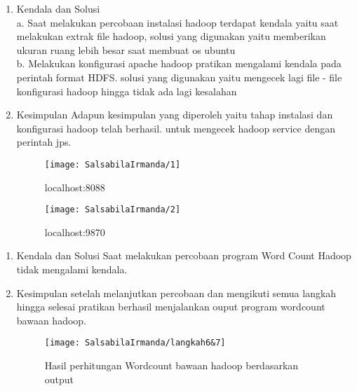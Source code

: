 
\begin{enumerate}
\item Kendala dan Solusi\\
a. Saat melakukan percobaan instalasi hadoop terdapat kendala yaitu saat melakukan extrak file hadoop, solusi yang digunakan yaitu memberikan ukuran ruang lebih besar saat membuat os ubuntu\\
b. Melakukan konfigurasi apache hadoop pratikan mengalami kendala pada perintah format HDFS. solusi yang digunakan yaitu mengecek lagi file - file konfigurasi hadoop hingga tidak ada lagi kesalahan

\item Kesimpulan
Adapun kesimpulan yang diperoleh yaitu tahap instalasi dan konfigurasi hadoop telah berhasil. untuk mengecek hadoop service dengan perintah jps.
\begin{figure}[!ht]
\texttt{[image: SalsabilaIrmanda/1]}
\caption{localhost:8088}
\label{gam:perkuliahan-22-09}
\end{figure}

\begin{figure}[!ht]
\texttt{[image: SalsabilaIrmanda/2]}
\caption{localhost:9870}
\label{gam:perkuliahan-22-09}
\end{figure}
\end{enumerate}

\begin{enumerate}
\item Kendala dan Solusi
Saat melakukan percobaan program Word Count Hadoop tidak mengalami kendala. 
\item Kesimpulan
setelah melanjutkan percobaan dan mengikuti semua langkah hingga selesai pratikan berhasil menjalankan ouput program wordcount bawaan hadoop. 

\begin{figure}[!ht]
\texttt{[image: SalsabilaIrmanda/langkah6\&7]}
\caption{Hasil perhitungan Wordcount bawaan hadoop berdasarkan output}
\label{gam:perkuliahan-08-12}
\end{figure}
\end{enumerate}

